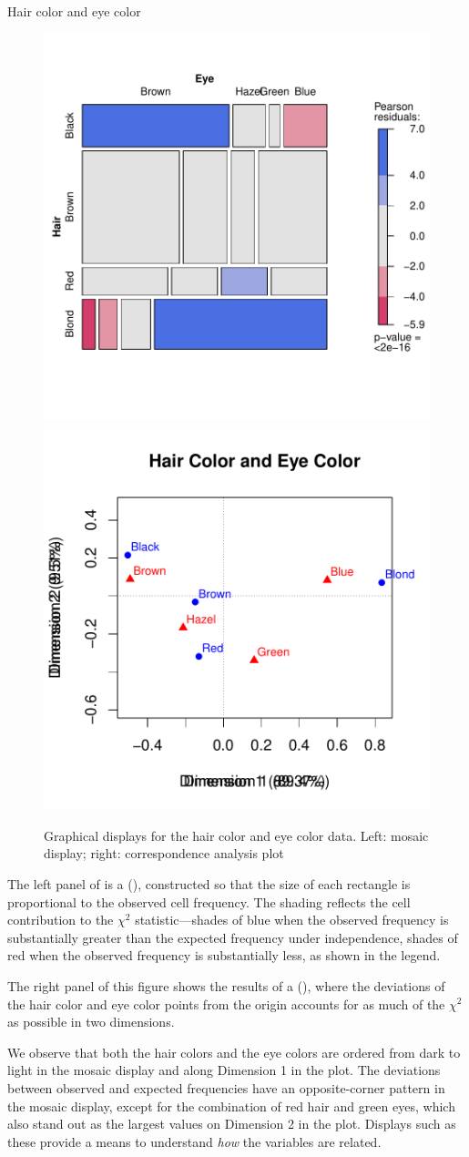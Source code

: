 \documentclass[11pt]{book}
\renewenvironment{knitrout}{\small\renewcommand{\baselinestretch}{.85}}{} %
\begin{document}
\begin{Example}[haireye0]{Hair color and eye color}
\begin{knitrout}
\begin{figure}[!htbp]
\centerline{\includegraphics[width=.49\textwidth]{ch01/fig/haireye021} 
\includegraphics[width=.49\textwidth]{ch01/fig/haireye022} }

\caption[Graphical displays for the hair color and eye color data]{Graphical displays for the hair color and eye color data. Left: mosaic display; right: correspondence analysis plot\label{fig:haireye02}}
\end{figure}


\end{knitrout}
The left panel of  is a 
(), constructed so that the size of each rectangle
is proportional to the observed cell frequency. The shading
reflects the cell contribution to the \(\chi^2\) statistic---shades of blue
when the observed frequency is substantially greater than the 
expected frequency under independence, shades of red when the observed frequency
is substantially less, as shown in the legend.

The right panel of this figure shows the results of 
a \ca (), where the deviations of the hair color and eye
color points from the origin accounts for as much of the \(\chi^2\)
as possible in two dimensions.

We observe that both the hair colors and the eye colors
are ordered from dark to light in the mosaic display and along
Dimension 1 in the \ca plot.  The deviations between observed
and expected frequencies have an opposite-corner pattern in the
mosaic display, except for the combination of red hair and green
eyes, which also stand out as the largest values on Dimension 2
in the \CA plot.
Displays such as these provide a means to understand \emph{how}
the variables are related.
\end{Example}
\end{document}
